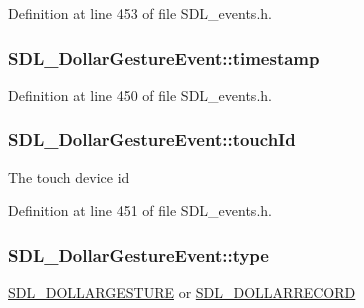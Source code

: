 Definition at line 453 of file S\-D\-L\-\_\-events.\-h.

\hypertarget{struct_s_d_l___dollar_gesture_event_a3bccd8ebdf30b79c0f4074f6471ec583}{
\subsubsection[{timestamp}]{ S\-D\-L\-\_\-\-Dollar\-Gesture\-Event\-::timestamp}}\label{struct_s_d_l___dollar_gesture_event_a3bccd8ebdf30b79c0f4074f6471ec583}


Definition at line 450 of file S\-D\-L\-\_\-events.\-h.

\hypertarget{struct_s_d_l___dollar_gesture_event_a40402f6911ed0dba48e6b23aa02bd83d}{
\subsubsection[{touch\-Id}]{ S\-D\-L\-\_\-\-Dollar\-Gesture\-Event\-::touch\-Id}}\label{struct_s_d_l___dollar_gesture_event_a40402f6911ed0dba48e6b23aa02bd83d}
The touch device id 

Definition at line 451 of file S\-D\-L\-\_\-events.\-h.

\hypertarget{struct_s_d_l___dollar_gesture_event_ac7f6948754a1b2eb36edde043bf75ce9}{
\subsubsection[{type}]{ S\-D\-L\-\_\-\-Dollar\-Gesture\-Event\-::type}}\label{struct_s_d_l___dollar_gesture_event_ac7f6948754a1b2eb36edde043bf75ce9}
\hyperlink{_s_d_l__events_8h_a3b589e89be6b35c02e0dd34a55f3fccaaac5b40f77c7e1eba688d536d465989c6}{S\-D\-L\-\_\-\-D\-O\-L\-L\-A\-R\-G\-E\-S\-T\-U\-R\-E} or \hyperlink{_s_d_l__events_8h_a3b589e89be6b35c02e0dd34a55f3fccaa9ce9b2a0e8fd0e130d8ac8499704a277}{S\-D\-L\-\_\-\-D\-O\-L\-L\-A\-R\-R\-E\-C\-O\-R\-D} 

